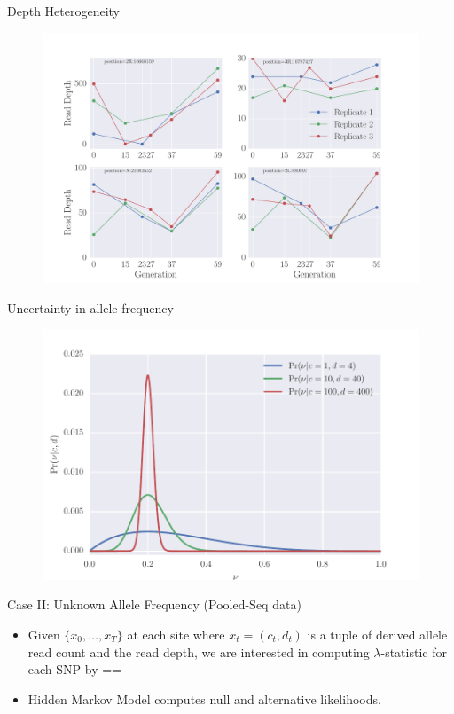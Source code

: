 \documentclass[t]{beamer} %
\begin{document}
		\begin{frame}{Depth Heterogeneity}
			\begin{figure}
				\includegraphics[trim={0.05in 0.0in 0.in 0in},clip,scale=0.35]{../figures/depthHetero}
			\end{figure}
		\end{frame}	
	
		\begin{frame}{Uncertainty in allele frequency}

			\begin{figure}
				\includegraphics[trim={0.05in 0.0in 0.in 0in},clip,scale=0.7]{../figures/stateConditional}
			\end{figure}
		\end{frame}	
	
	\begin{frame}{Case II: Unknown Allele Frequency (Pooled-Seq data)}
		\begin{itemize}
			\item Given  $\{x_0,\ldots, x_T\}$ at each site where $x_t=(c_t,d_t)$ is a tuple of derived allele read count and the read depth, we are interested in  computing $\lambda$-statistic for each SNP by
			\beq
			\lambda==
			\eeq
			\item Hidden Markov Model computes null and alternative likelihoods.
		\end{itemize}

	\end{frame}	
	
\end{document}
